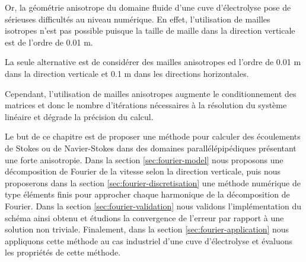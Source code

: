 Or, la géométrie anisotrope du domaine fluide d'une cuve d'électrolyse
pose de sérieuses difficultés au niveau numérique. En effet,
l'utilisation de mailles isotropes n'est pas possible puisque la
taille de maille dans la direction verticale est de l'ordre de
\num{0.01} \si{\meter}.

La seule alternative est de considérer des mailles anisotropes ed
l'ordre de \num{0.01} \si{\meter} dans la direction verticale et
\num{0.1} \si{\meter} dans les directions horizontales.

Cependant, l'utilisation de mailles anisotropes augmente le
conditionnement des matrices et donc le nombre d'itérations
nécessaires à la résolution du système linéaire et dégrade la
précision du calcul.

Le but de ce chapitre est de proposer une méthode pour calculer des
écoulements de Stokes ou de Navier-Stokes dans des domaines
parallélépipédiques présentant une forte anisotropie. Dans la section
\ref{sec:fourier-model} nous proposons une décomposition de Fourier de la
vitesse selon la direction verticale, puis nous proposerons dans la
section \ref{sec:fourier-discretisation} une méthode numérique de type éléments
finis pour approcher chaque harmonique de la décomposition de
Fourier. Dans la section \ref{sec:fourier-validation} nous validons
l'implémentation du schéma ainsi obtenu et étudions la convergence de
l'erreur par rapport à une solution non triviale. Finalement, dans la
section \ref{sec:fourier-application} nous appliquons cette méthode au
cas industriel d'une cuve d'électrolyse et évaluons les propriétés de
cette méthode.
